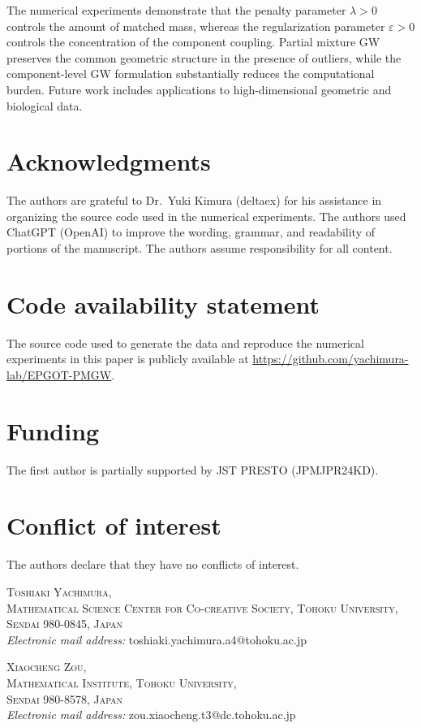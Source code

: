 \documentclass[a4paper,11pt]{article}
\numberwithin{equation}{section}
\newcommand{\eps}{\varepsilon}
\begin{document}
The numerical experiments demonstrate that the penalty parameter $\lambda>0$ controls the amount of matched mass, whereas the regularization parameter $\eps>0$ controls the concentration of the component coupling. Partial mixture GW preserves the common geometric structure in the presence of outliers, while the component-level GW formulation substantially reduces the computational burden. Future work includes applications to high-dimensional geometric and biological data.


\section*{Acknowledgments}
The authors are grateful to Dr.~Yuki Kimura (deltaex) for his assistance in organizing the source code used in the numerical experiments. The authors used ChatGPT (OpenAI) to improve the wording, grammar, and readability of portions of the manuscript. The authors assume responsibility for all content.


\section*{Code availability statement}
The source code used to generate the data and reproduce the numerical experiments in this paper is publicly available at \url{https://github.com/yachimura-lab/EPGOT-PMGW}.


\section*{Funding}
The first author is partially supported by JST PRESTO (JPMJPR24KD).


\section*{Conflict of interest}
The authors declare that they have no conflicts of interest.





\bigskip
\noindent
\textsc{Toshiaki Yachimura,\\
Mathematical Science Center for Co-creative Society, Tohoku University,\\
Sendai 980-0845, Japan}\\
\noindent
\emph{Electronic mail address:} toshiaki.yachimura.a4@tohoku.ac.jp

\bigskip

\noindent
\textsc{Xiaocheng Zou,\\
Mathematical Institute, Tohoku University,\\
Sendai 980-8578, Japan}\\
\noindent
\emph{Electronic mail address:} zou.xiaocheng.t3@dc.tohoku.ac.jp
\end{document}
